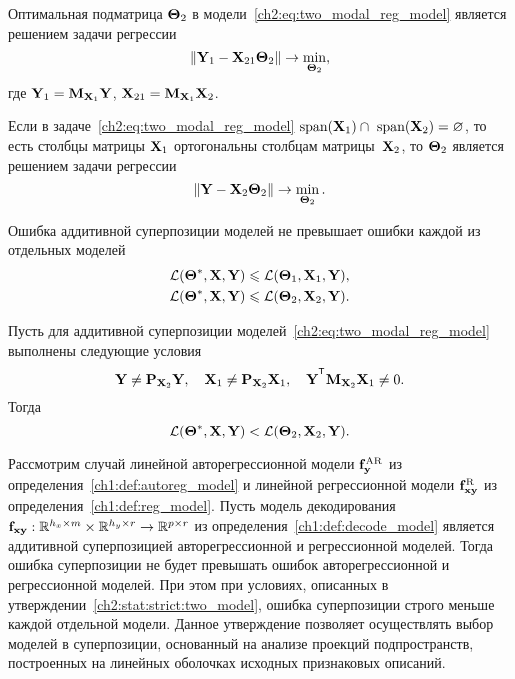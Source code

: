\documentclass[11pt, a5paper]{dissert}
\begin{document}
\begin{statement}
	\label{ch2:stat:two_modal_theta2}
	Оптимальная подматрица $\boldsymbol{\Theta}_2$ в модели~\eqref{ch2:eq:two_modal_reg_model} является решением задачи регрессии
	\begin{equation}
		\| \mathbf{Y}_1 -  \mathbf{X}_{21} \boldsymbol{\Theta}_2 \| \rightarrow \min_{\boldsymbol{\Theta}_2},
		\label{ch2:eq:two_modal_fwl}
	\end{equation}
	где $\mathbf{Y}_1 = \mathbf{M}_{\mathbf{X}_1} \mathbf{Y}$, $\mathbf{X}_{21} = \mathbf{M}_{\mathbf{X}_1} \mathbf{X}_2$.
\end{statement}

\begin{statement}
	Если в задаче~\eqref{ch2:eq:two_modal_reg_model} $\text{span}(\mathbf{X}_1) \cap \text{ span}(\mathbf{X}_2) = \varnothing$, то есть столбцы матрицы $\mathbf{X}_1$ ортогональны столбцам матрицы~$\mathbf{X}_2$, то $\boldsymbol{\Theta}_2$ является решением задачи регрессии
	\[
		\| \mathbf{Y} -  \mathbf{X}_{2} \boldsymbol{\Theta}_2 \| \rightarrow \min_{\boldsymbol{\Theta}_2}.
	\]
\end{statement}

\begin{statement}
	Ошибка аддитивной суперпозиции моделей не превышает ошибки каждой из отдельных моделей
	\begin{align*}
		\mathcal{L}(\boldsymbol{\Theta}^*, \mathbf{X}, \mathbf{Y}) &\leqslant \mathcal{L}(\boldsymbol{\Theta}_1, \mathbf{X}_1, \mathbf{Y}), \\
		\mathcal{L}(\boldsymbol{\Theta}^*, \mathbf{X}, \mathbf{Y}) &\leqslant \mathcal{L}(\boldsymbol{\Theta}_2, \mathbf{X}_2, \mathbf{Y}).
	\end{align*}
\end{statement}

\begin{statement}
	\label{ch2:stat:strict:two_model}
	Пусть для аддитивной суперпозиции моделей~\eqref{ch2:eq:two_modal_reg_model} выполнены следующие условия
	\[
		\bY \neq \bP_{\bX_2} \bY, \quad \bX_1 \neq \bP_{\bX_2} \bX_1, \quad \bY^{\T} \bM_{\bX_2} \bX_1 \neq 0.
	\]
	Тогда
	\[
		\mathcal{L}(\boldsymbol{\Theta}^*, \mathbf{X}, \mathbf{Y}) < \mathcal{L}(\boldsymbol{\Theta}_2, \mathbf{X}_2, \mathbf{Y}).
	\]
\end{statement}

Рассмотрим случай линейной авторегрессионной модели $\mathbf{f}^{\text{AR}}_{\mathbf{y}}$ из определения~\ref{ch1:def:autoreg_model} и линейной регрессионной модели $\mathbf{f}^{\text{R}}_{\mathbf{x}\mathbf{y}}$ из определения~\ref{ch1:def:reg_model}. 
Пусть модель декодирования $\mathbf{f}_{\mathbf{x}\mathbf{y}}: \mathbb{R}^{h_x \times m} \times \mathbb{R}^{h_y \times r} \rightarrow \mathbb{R}^{p \times r}$ из определения~\ref{ch1:def:decode_model} является аддитивной суперпозицией авторегрессионной и регрессионной моделей.
Тогда ошибка суперпозиции не будет превышать ошибок авторегрессионной и регрессионной моделей.
При этом при условиях, описанных в утверждении~\ref{ch2:stat:strict:two_model}, ошибка суперпозиции строго меньше каждой отдельной модели.
Данное утверждение позволяет осуществлять выбор моделей в суперпозиции, основанный на анализе проекций подпространств, построенных на линейных оболочках исходных признаковых описаний.
\end{document}
